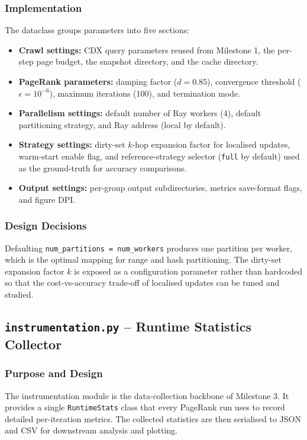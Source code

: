\documentclass[11pt,a4paper]{article}
\begin{document}
\subsubsection{Implementation}
The dataclass groups parameters into five sections:
\begin{itemize}
    \item \textbf{Crawl settings:} CDX query parameters reused from
    Milestone 1, the per-step page budget, the snapshot directory, and
    the cache directory.
    \item \textbf{PageRank parameters:} damping factor ($d=0.85$),
    convergence threshold ($\epsilon = 10^{-6}$), maximum iterations
    (100), and termination mode.
    \item \textbf{Parallelism settings:} default number of Ray workers
    (4), default partitioning strategy, and Ray address (local by
    default).
    \item \textbf{Strategy settings:} dirty-set $k$-hop expansion factor
    for localised updates, warm-start enable flag, and reference-strategy
    selector (\texttt{full} by default) used as the ground-truth for
    accuracy comparisons.
    \item \textbf{Output settings:} per-group output subdirectories,
    metrics save-format flags, and figure DPI.
\end{itemize}

\subsubsection{Design Decisions}
Defaulting \texttt{num\_partitions = num\_workers} produces one partition
per worker, which is the optimal mapping for range and hash partitioning.
The dirty-set expansion factor $k$ is exposed as a configuration
parameter rather than hardcoded so that the cost-vs-accuracy trade-off of
localised updates can be tuned and studied.

\subsection{\texttt{instrumentation.py} -- Runtime Statistics Collector}
\label{sec:module-instrumentation}

\subsubsection{Purpose and Design}
The instrumentation module is the data-collection backbone of Milestone
3. It provides a single \texttt{RuntimeStats} class that every PageRank
run uses to record detailed per-iteration metrics. The collected
statistics are then serialised to JSON and CSV for downstream analysis
and plotting.
\end{document}
